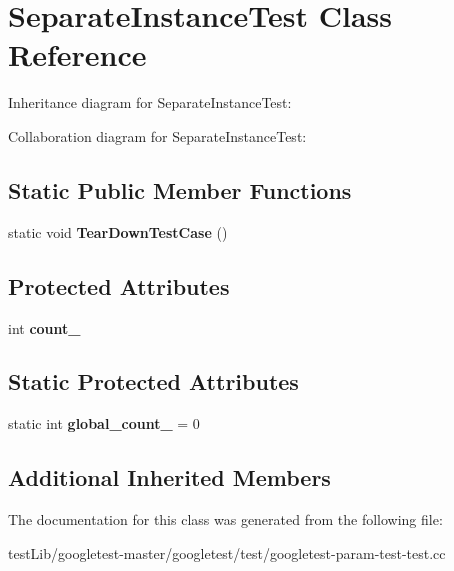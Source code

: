 \hypertarget{classSeparateInstanceTest}{}\section{Separate\+Instance\+Test Class Reference}
\label{classSeparateInstanceTest}


Inheritance diagram for Separate\+Instance\+Test\+:


Collaboration diagram for Separate\+Instance\+Test\+:
\subsection*{Static Public Member Functions}
\begin{DoxyCompactItemize}
\item 
\mbox{\label{classSeparateInstanceTest_a7c4a72843a7c4a9be56adef27ecd33c7}} 
static void {\bfseries Tear\+Down\+Test\+Case} ()
\end{DoxyCompactItemize}
\subsection*{Protected Attributes}
\begin{DoxyCompactItemize}
\item 
\mbox{\label{classSeparateInstanceTest_a04af1b3b711671ecb0778af1330a740f}} 
int {\bfseries count\+\_\+}
\end{DoxyCompactItemize}
\subsection*{Static Protected Attributes}
\begin{DoxyCompactItemize}
\item 
\mbox{\label{classSeparateInstanceTest_a79db6d4cdd6c99b256439cc020f782ef}} 
static int {\bfseries global\+\_\+count\+\_\+} = 0
\end{DoxyCompactItemize}
\subsection*{Additional Inherited Members}


The documentation for this class was generated from the following file\+:\begin{DoxyCompactItemize}
\item 
test\+Lib/googletest-\/master/googletest/test/googletest-\/param-\/test-\/test.\+cc\end{DoxyCompactItemize}
